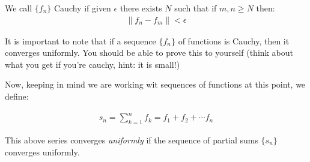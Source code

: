 \begin{defn}
  We call $\{f_n\}$ Cauchy if given $\epsilon$ there exists $N$ such that if $m, n \geq N$ then:
  \begin{align*}
    \| f_n - f_m \| < \epsilon
  \end{align*}
\end{defn}

It is important to note that if a sequence $\{f_n\}$ of functions is Cauchy, then it converges 
uniformly. You should be able to prove this to yourself (think about what you get if you're cauchy, hint: it 
is small!)

Now, keeping in mind we are working wit sequences of functions at this point, we define:

\begin{defn}
  \begin{align*}
    s_n = \sum_{k = 1}^{n} f_k = f_1 + f_2 + \cdots f_n
  \end{align*}
\end{defn}

This above series converges \emph{uniformly} if the sequence of partial sums $\{s_n\}$ converges uniformly.
